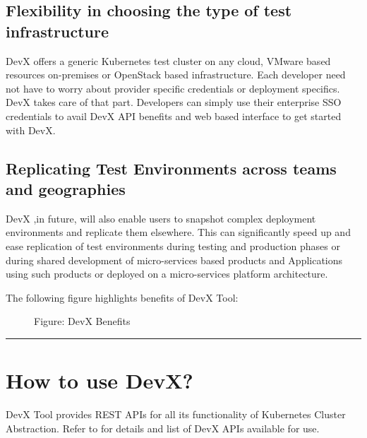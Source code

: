 \documentclass[letterpaper,10pt,english]{sphinxmanual}
\begin{document}
\section{Flexibility in choosing the type of test infrastructure}
\label{\detokenize{devx:flexibility-in-choosing-the-type-of-test-infrastructure}}
DevX offers a generic Kubernetes test cluster on any cloud, VMware based resources on-premises or OpenStack based infrastructure. Each developer need not have to worry about provider specific credentials or deployment specifics.  DevX takes care of that part.  Developers can simply use their enterprise SSO credentials to avail DevX API benefits and web based interface to get started with DevX.


\section{Replicating Test Environments across teams and geographies}
\label{\detokenize{devx:replicating-test-environments-across-teams-and-geographies}}
DevX ,in future, will also enable users to snapshot complex deployment environments and replicate them elsewhere.  This can significantly speed up and ease replication of test environments during testing and production phases or during shared development of micro-services based products and Applications using such products or deployed on a micro-services platform architecture.

The following figure highlights benefits of DevX Tool:

\begin{figure}[htbp]
\centering
\capstart

\noindent{}
\caption{Figure: DevX Benefits}\label{\detokenize{devx:id5}}\end{figure}


\bigskip\hrule\bigskip



\chapter{How to use DevX?}
\label{\detokenize{devx:para-how-to-use}}\label{\detokenize{devx:how-to-use-devx}}
DevX Tool provides REST APIs for all its functionality of Kubernetes Cluster Abstraction. Refer to  for details and list of DevX APIs available for use.
\end{document}
